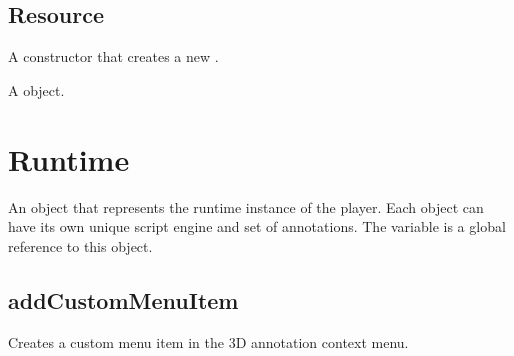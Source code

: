 \documentclass[letterpaper,12pt,english,openany,oneside]{sphinxmanual}
\begin{document}
\label{\detokenize{JS_3D_API:properties-23}}


\subsection{Resource}
\label{\detokenize{JS_3D_API:resource-1}}\label{\detokenize{JS_3D_API:id26}}
A constructor that creates a new .

\label{\detokenize{JS_3D_API:syntax-80}}

\begin{sphinxVerbatim}[commandchars=\\\{\}]
 
\end{sphinxVerbatim}
\label{\detokenize{JS_3D_API:parameters-58}}

\label{\detokenize{JS_3D_API:section-85}}\label{\detokenize{JS_3D_API:returns-81}}

A  object.


\section{Runtime}
\label{\detokenize{JS_3D_API:runtime}}
An object that represents the run\sphinxhyphen{}time instance of the player. Each  object can have its own unique script engine and set of annotations. The variable  is a global reference to this object.

\label{\detokenize{JS_3D_API:properties-24}}


\subsection{addCustomMenuItem}
\label{\detokenize{JS_3D_API:addcustommenuitem}}
Creates a custom menu item in the 3D annotation context menu.

\label{\detokenize{JS_3D_API:syntax-81}}

\begin{sphinxVerbatim}[commandchars=\\\{\}]
   
\end{sphinxVerbatim}
\label{\detokenize{JS_3D_API:parameters-59}}
\end{document}
